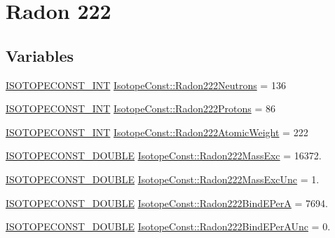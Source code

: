 \hypertarget{group___isotope_const-_radon-_rn222}{}\section{Radon 222}
\label{group___isotope_const-_radon-_rn222}
\subsection*{Variables}
\begin{DoxyCompactItemize}
\item 
\mbox{\hyperlink{group___isotope_const-_macros_ga5f18360b3e99483a35c32d789e62621c}{I\+S\+O\+T\+O\+P\+E\+C\+O\+N\+S\+T\+\_\+\+I\+NT}} \mbox{\hyperlink{group___isotope_const-_radon-_rn222_ga82fa9565e69c20288db81461a325118c}{Isotope\+Const\+::\+Radon222\+Neutrons}} = 136
\item 
\mbox{\hyperlink{group___isotope_const-_macros_ga5f18360b3e99483a35c32d789e62621c}{I\+S\+O\+T\+O\+P\+E\+C\+O\+N\+S\+T\+\_\+\+I\+NT}} \mbox{\hyperlink{group___isotope_const-_radon-_rn222_gaf820000a065fe695769f4a440475b0e8}{Isotope\+Const\+::\+Radon222\+Protons}} = 86
\item 
\mbox{\hyperlink{group___isotope_const-_macros_ga5f18360b3e99483a35c32d789e62621c}{I\+S\+O\+T\+O\+P\+E\+C\+O\+N\+S\+T\+\_\+\+I\+NT}} \mbox{\hyperlink{group___isotope_const-_radon-_rn222_gac58a1d19a437dbc1a1dda822156508f5}{Isotope\+Const\+::\+Radon222\+Atomic\+Weight}} = 222
\item 
\mbox{\hyperlink{group___isotope_const-_macros_ga8f45a7272ce02c0b4c65c44636ed719a}{I\+S\+O\+T\+O\+P\+E\+C\+O\+N\+S\+T\+\_\+\+D\+O\+U\+B\+LE}} \mbox{\hyperlink{group___isotope_const-_radon-_rn222_gad4307c96271c050d85573d6ba59d7e1a}{Isotope\+Const\+::\+Radon222\+Mass\+Exc}} = 16372.
\item 
\mbox{\hyperlink{group___isotope_const-_macros_ga8f45a7272ce02c0b4c65c44636ed719a}{I\+S\+O\+T\+O\+P\+E\+C\+O\+N\+S\+T\+\_\+\+D\+O\+U\+B\+LE}} \mbox{\hyperlink{group___isotope_const-_radon-_rn222_ga9e688adcb056df584c280b5663689835}{Isotope\+Const\+::\+Radon222\+Mass\+Exc\+Unc}} = 1.
\item 
\mbox{\hyperlink{group___isotope_const-_macros_ga8f45a7272ce02c0b4c65c44636ed719a}{I\+S\+O\+T\+O\+P\+E\+C\+O\+N\+S\+T\+\_\+\+D\+O\+U\+B\+LE}} \mbox{\hyperlink{group___isotope_const-_radon-_rn222_gaead27f895f3d7a4cf4aa700457ea0494}{Isotope\+Const\+::\+Radon222\+Bind\+E\+PerA}} = 7694.
\item 
\mbox{\hyperlink{group___isotope_const-_macros_ga8f45a7272ce02c0b4c65c44636ed719a}{I\+S\+O\+T\+O\+P\+E\+C\+O\+N\+S\+T\+\_\+\+D\+O\+U\+B\+LE}} \mbox{\hyperlink{group___isotope_const-_radon-_rn222_ga9293b6c5adb6c7ac39087b6030cd2167}{Isotope\+Const\+::\+Radon222\+Bind\+E\+Per\+A\+Unc}} = 0.

\end{DoxyCompactItemize}
